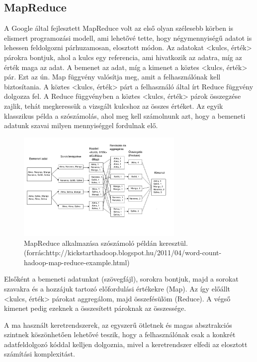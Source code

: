 \documentclass[a4paper,12pt]{article}
\begin{document}
\subsection{MapReduce}
A Google által fejlesztett MapReduce volt az első olyan szélesebb körben is elismert programozási modell, ami lehetővé tette, hogy négymennyiségű adatot is lehessen feldolgozni párhuzamosan, elosztott módon. \cite{mapreduce} Az adatokat <kulcs, érték> párokra bontjuk, ahol a kulcs egy referencia, ami hivatkozik az adatra, míg az érték maga az adat. A bemenet az adat, míg a kimenet a köztes <kulcs, érték> pár. Ezt az ún. Map függvény valósítja meg, amit a felhasználónak kell biztosítania. A köztes <kulcs, érték> párt a felhasználó által írt Reduce függvény dolgozza fel. A Reduce függvényben a köztes <kulcs, érték> párok összegzése  zajlik, tehát megkeressük a vizsgált kulcshoz az összes értéket. \newline
Az egyik klasszikus példa a szószámolás, ahol meg kell számolnunk azt, hogy a bemeneti adatunk szavai milyen mennyiséggel fordulnak elő.

\begin{figure}[ht!]
\centering
\includegraphics[width=80mm]{img/wordcountflow.jpg}
\caption{MapReduce alkalmazása szószámoló példán keresztül. (forrás:http://kickstarthadoop.blogspot.hu/2011/04/word-count-hadoop-map-reduce-example.html)
\label{wordcountflow}}
\end{figure}

Elsőként a bemeneti adatunkat (szövegfájl), sorokra bontjuk, majd a sorokat szavakra és a hozzájuk tartozó előfordulási értékekre (Map). Az így előállt <kulcs, érték> párokat aggregálom, majd összefésülöm (Reduce). A végső kimenet pedig ezeknek a összesített pároknak az összessége.

A ma használt keretrendszerek, az egyszerű ötletnek és magas absztrakciós szintnek köszönhetően lehetővé teszik, hogy a felhasználónak csak a konkrét adatfeldolgozó kóddal kelljen dolgoznia, mivel a keretrendszer elfedi az elosztott számítási komplexitást. \cite{hadoop}
\end{document}
